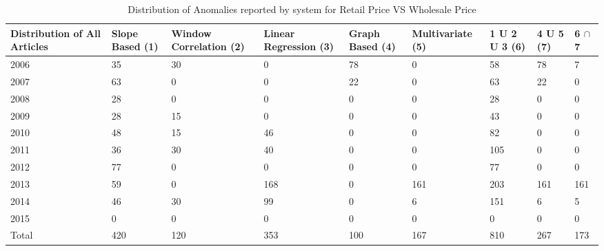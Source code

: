 \documentclass[a4paper,10pt]{report}
\begin{document}
	
	\begin{table}[]
	\centering
	\resizebox{\textwidth}{!}
	{\begin{tabular}{|l|l|l|l|l|l|l|l|l|}
	\hline
	Distribution of All Articles & Slope Based (1) & Window Correlation (2) & Linear Regression (3) & Graph Based (4) & Multivariate (5) & 1 U 2 U 3 (6) & 4 U 5 (7) & 6  $\cap$ 7 \\
	\hline
	2006                         & 35          & 30          & 0                 & 78          & 0             & 58        & 78    & 7                                     \\
	\hline
	2007                         & 63          & 0           & 0                 & 22          & 0             & 63        & 22    & 0                                     \\
	\hline
	2008                         & 28          & 0           & 0                 & 0           & 0             & 28        & 0     & 0                                     \\
	\hline
	2009                         & 28          & 15          & 0                 & 0           & 0             & 43        & 0     & 0                                     \\
	\hline
	2010                         & 48          & 15          & 46                & 0           & 0             & 82        & 0     & 0                                     \\
	\hline
	2011                         & 36          & 30          & 40                & 0           & 0             & 105       & 0     & 0                                     \\
	\hline
	2012                         & 77          & 0           & 0                 & 0           & 0             & 77        & 0     & 0                                     \\
	\hline
	2013                         & 59          & 0           & 168               & 0           & 161           & 203       & 161   & 161                                   \\
	\hline
	2014                         & 46          & 30          & 99                & 0           & 6             & 151       & 6     & 5                                     \\
	\hline
	2015                         & 0           & 0           & 0                 & 0           & 0             & 0         & 0     & 0                                     \\
	\hline
	Total			    & 420         & 120         & 353               & 100         & 167           & 810       & 267   & 173                                   \\
	\hline
	\end{tabular}}
	\caption{Distribution of Anomalies reported by system for Retail Price VS Wholesale Price }
	\label{RetailVsWholesaleDist}
	\end{table}
	
\end{document}
